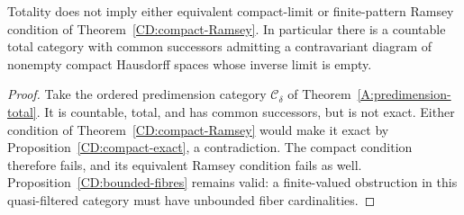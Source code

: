 \begin{corollary}
\label{CD:unresolved}
Totality does not imply either equivalent compact-limit or
finite-pattern Ramsey condition of Theorem~\ref{CD:compact-Ramsey}.
In particular there is a countable total category with common
successors admitting a contravariant diagram of nonempty compact
Hausdorff spaces whose inverse limit is empty.
\end{corollary}
\begin{proof}
Take the ordered predimension category $\mathcal C_\delta$ of
Theorem~\ref{A:predimension-total}. It is countable, total, and
has common successors, but is not exact. Either condition of
Theorem~\ref{CD:compact-Ramsey} would make it exact by
Proposition~\ref{CD:compact-exact}, a contradiction. The compact
condition therefore fails, and its equivalent Ramsey condition
fails as well. Proposition~\ref{CD:bounded-fibres} remains valid:
a finite-valued obstruction in this quasi-filtered category must
have unbounded fiber cardinalities.
\end{proof}
